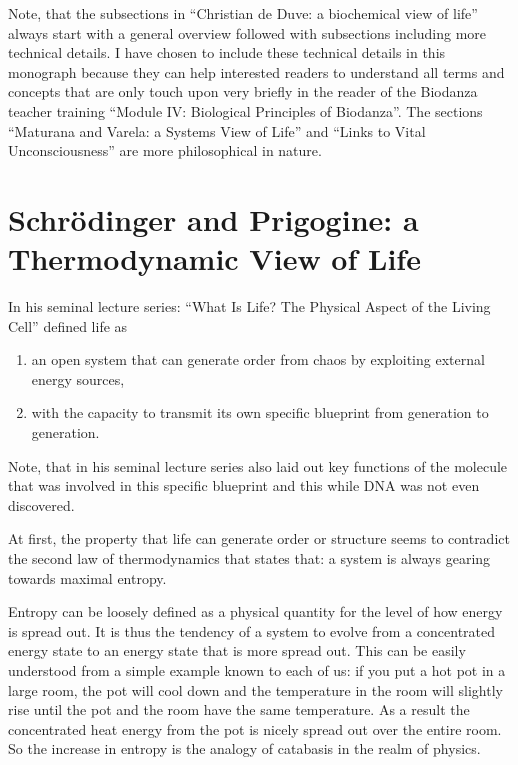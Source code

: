 \documentclass[
  11pt,
]{book}
\begin{document}
Note, that the subsections in ``Christian de Duve: a biochemical view of life'' always start with a general overview followed with subsections including more technical details. I have chosen to include these technical details in this monograph because they can help interested readers to understand all terms and concepts that are only touch upon very briefly in the reader of the Biodanza teacher training ``Module IV: Biological Principles of Biodanza''. The sections ``Maturana and Varela: a Systems View of Life'' and ``Links to Vital Unconsciousness'' are more philosophical in nature.

\newpage

\hypertarget{schruxf6dinger-and-prigogine-a-thermodynamic-view-of-life}{%
\section{Schrödinger and Prigogine: a Thermodynamic View of Life}\label{schruxf6dinger-and-prigogine-a-thermodynamic-view-of-life}}

In his seminal lecture series: ``What Is Life? The Physical Aspect of the Living Cell'' \citet{schrodinger1944} defined life as

\begin{enumerate}
\def\labelenumi{\arabic{enumi}.}
\item
  an open system that can generate order from chaos by exploiting external energy sources,
\item
  with the capacity to transmit its own specific blueprint from generation to generation.
\end{enumerate}

Note, that in his seminal lecture series \citet{schrodinger1944} also laid out key functions of the molecule that was involved in this specific blueprint and this while DNA was not even discovered.

At first, the property that life can generate order or structure seems to contradict the second law of thermodynamics that states that: a system is always gearing towards maximal entropy.

Entropy can be loosely defined as a physical quantity for the level of how energy is spread out. It is thus the tendency of a system to evolve from a concentrated energy state to an energy state that is more spread out. This can be easily understood from a simple example known to each of us: if you put a hot pot in a large room, the pot will cool down and the temperature in the room will slightly rise until the pot and the room have the same temperature. As a result the concentrated heat energy from the pot is nicely spread out over the entire room. So the increase in entropy is the analogy of catabasis in the realm of physics.
\end{document}
